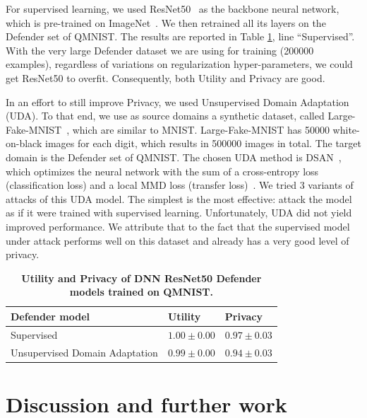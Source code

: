 \documentclass[letterpaper]{article}
\begin{document}
For supervised learning, we used ResNet50~\cite{he2016deep} as the backbone neural network, which is pre-trained on ImageNet~\cite{deng2009imagenet}. We then retrained all its layers on the Defender set of QMNIST. The results are reported in Table \ref{tab:DA}, line ``Supervised''. With the very large Defender dataset we are using for training (200000 examples), regardless of variations on regularization hyper-parameters, we could get ResNet50 to overfit. Consequently, both Utility and Privacy are good.

In an effort to still improve Privacy, we used Unsupervised Domain Adaptation (UDA). To that end, we use as source domains  a synthetic dataset, called Large-Fake-MNIST~\cite{sun2021omniprint}, which are similar to MNIST. Large-Fake-MNIST has 50000 white-on-black images for each digit, which results in 500000 images in total. The target domain is the Defender set of QMNIST. The chosen UDA method is DSAN~\cite{zhuDeepSubdomainAdaptation2021,deepdaJindong}, which optimizes the neural network with the sum of a cross-entropy loss (classification loss) and a local MMD loss (transfer loss)~\cite{zhuDeepSubdomainAdaptation2021}. We tried 3 variants of attacks of this UDA model. The simplest is the most effective: attack the model as if it were trained with supervised learning. Unfortunately, UDA did not yield improved performance. We attribute that to the fact that the supervised model under attack performs well on this dataset and already has a very good level of privacy.



\begin{table}[h]

\caption{\label{tab:DA} \footnotesize \bf Utility and Privacy of DNN ResNet50 Defender models trained on QMNIST.}
\centering
\setlength{\tabcolsep}{0.5mm}{}
\begin{tabular}{|l|l|l|}
\hline
\cline{1-3}
Defender model  & Utility & Privacy \\
\hline
Supervised & \(1.00\pm 0.00\) & \(0.97\pm 0.03\) \\
\hline
Unsupervised Domain Adaptation  & \( 0.99\pm 0.00\) & \( 0.94\pm 0.03\) \\
\hline
\end{tabular}

\end{table}


\section{Discussion and further work}
\label{sec:discussion}
\end{document}
